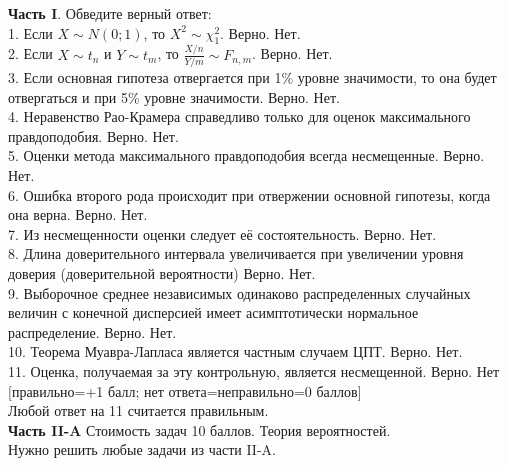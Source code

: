 \documentclass[12pt, a4paper]{article}\usepackage[]{graphicx}\usepackage[]{color}
\begin{document}
	\textbf{Часть I}. Обведите верный ответ: \\

	1. Если $X\sim N(0;1)$, то $X^{2}\sim \chi^{2}_{1}$. Верно. Нет. \\

	2. Если $X\sim t_{n}$ и $Y\sim t_{m}$, то $\frac{X/n}{Y/m}\sim F_{n,m}$. Верно. Нет. \\

	3.	Если основная гипотеза отвергается  при 1\% уровне значимости, то она будет отвергаться и при 5\% уровне значимости. Верно. Нет. \\

	4.	Неравенство Рао-Крамера справедливо только для оценок максимального правдоподобия. Верно. Нет. \\

	5.	Оценки метода максимального правдоподобия всегда несмещенные. Верно. Нет. \\

	6.	Ошибка второго рода происходит при отвержении основной гипотезы, когда она верна. Верно. Нет. \\

	7.	Из несмещенности оценки следует её состоятельность. Верно. Нет. \\

	8.	Длина доверительного интервала увеличивается при увеличении уровня доверия (доверительной вероятности) Верно. Нет. \\

	9.	Выборочное среднее независимых одинаково распределенных случайных величин с конечной дисперсией имеет асимптотически нормальное распределение. Верно. Нет. \\

	10.	Теорема Муавра-Лапласа  является частным случаем ЦПТ. Верно. Нет. \\

	11.	 Оценка, получаемая за эту контрольную, является несмещенной. Верно. Нет\\


	$[$правильно=+1 балл; нет ответа=неправильно=0 баллов$]$ \\
	Любой ответ на 11 считается правильным. \\


	\textbf{Часть II-A} Стоимость задач 10 баллов. Теория вероятностей. \\

	Нужно решить любые \textbf{} задачи из части II-A. \\
\end{document}
